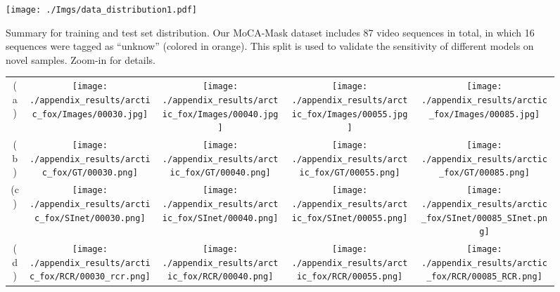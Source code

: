 \documentclass[10pt,twocolumn,letterpaper]{article}
\begin{document}
\begin{figure*}[ht]
\begin{center}
\texttt{[image: ./Imgs/data\_distribution1.pdf]}
\end{center}
\vspace{-8mm}
\caption{Summary for training and test set distribution. Our MoCA-Mask dataset includes 87 video sequences in total, in which 16 sequences were tagged as ``unknow'' (colored in orange). This split is used to validate the sensitivity of different models on novel samples. Zoom-in for details.}
\label{fig:data_distribution}
\end{figure*}

\begin{figure*}[t!]
\small
    \centering
    \tabcolsep=0.02cm
    \renewcommand{\arraystretch}{0.8}
    \begin{tabular}{c c c c c}
    (a) &
    \texttt{[image: ./appendix\_results/arctic\_fox/Images/00030.jpg]} & 
    \texttt{[image: ./appendix\_results/arctic\_fox/Images/00040.jpg]} & 
    \texttt{[image: ./appendix\_results/arctic\_fox/Images/00055.jpg]} & 
    \texttt{[image: ./appendix\_results/arctic\_fox/Images/00085.jpg]} 
    \\
    (b) &
    \texttt{[image: ./appendix\_results/arctic\_fox/GT/00030.png]} & 
    \texttt{[image: ./appendix\_results/arctic\_fox/GT/00040.png]} & 
    \texttt{[image: ./appendix\_results/arctic\_fox/GT/00055.png]} & 
    \texttt{[image: ./appendix\_results/arctic\_fox/GT/00085.png]} 
    \\
    (c) &
    \texttt{[image: ./appendix\_results/arctic\_fox/SInet/00030.png]} & 
    \texttt{[image: ./appendix\_results/arctic\_fox/SInet/00040.png]} & 
    \texttt{[image: ./appendix\_results/arctic\_fox/SInet/00055.png]} & 
    \texttt{[image: ./appendix\_results/arctic\_fox/SInet/00085\_SInet.png]} 
    \\
    (d) &
    \texttt{[image: ./appendix\_results/arctic\_fox/RCR/00030\_rcr.png]} & 
    \texttt{[image: ./appendix\_results/arctic\_fox/RCR/00040.png]} & 
    \texttt{[image: ./appendix\_results/arctic\_fox/RCR/00055.png]} & 
    \texttt{[image: ./appendix\_results/arctic\_fox/RCR/00085\_RCR.png]}
    \\

\end{tabular}
\end{figure*}
\end{document}
